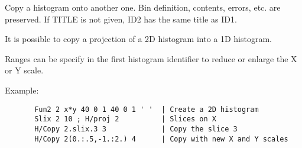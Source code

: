 \BEGARG
{}
\ENDARG

   \par
Copy a histogram onto another one.  Bin definition, contents, errors, etc. 
   are preserved.  If TITLE is not given, ID2 has the same title as ID1.  

   \par
It is possible to copy a projection of a 2D histogram into a 1D histogram.  

   \par
Ranges can be specify in the first histogram identifier to reduce or 
   enlarge the X or Y scale.  

   \par
Example:  
\begin{verbatim}
       Fun2 2 x*y 40 0 1 40 0 1 ' '  | Create a 2D histogram
       Slix 2 10 ; H/proj 2          | Slices on X
       H/Copy 2.slix.3 3             | Copy the slice 3
       H/Copy 2(0.:.5,-1.:2.) 4      | Copy with new X and Y scales
\end{verbatim}

\ENDCMD


